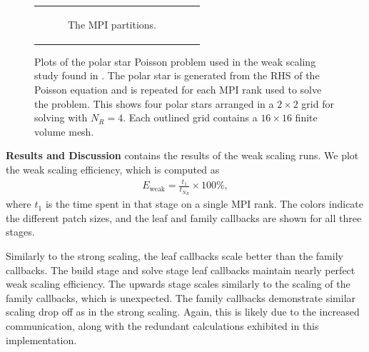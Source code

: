 \begin{figure}
\begin{tabular}{c c}
\begin{subfigure}[t]{0.45\textwidth}
            \caption{The MPI partitions.}
            \label{subfig:polar-star-partitions}
        \end{subfigure}
    \end{tabular}
    \caption{Plots of the polar star Poisson problem used in the weak scaling study found in . The polar star is generated from the RHS of the Poisson equation and is repeated for each MPI rank used to solve the problem. This shows four polar stars arranged in a $2 \times 2$ grid for solving with $N_R = 4$. Each outlined grid contains a $16 \times 16$ finite volume mesh.}
    \label{fig:polar-star-plots}
\end{figure}

{\bf Results and Discussion}
 contains the results of the weak scaling runs. We plot the weak scaling efficiency, which is computed as
\begin{align}
    E_{\text{weak}} = \frac{t_{1}}{t_{N_R}} \times 100 \%,
\end{align}
where $t_{1}$ is the time spent in that stage on a single MPI rank. The colors indicate the different patch sizes, and the leaf and family callbacks are shown for all three stages.

Similarly to the strong scaling, the leaf callbacks scale better than the family callbacks. The build stage and solve stage leaf callbacks maintain nearly perfect weak scaling efficiency. The upwards stage scales similarly to the scaling of the family callbacks, which is unexpected. The family callbacks demonstrate similar scaling drop off as in the strong scaling. Again, this is likely due to the increased communication, along with the redundant calculations exhibited in this implementation.

